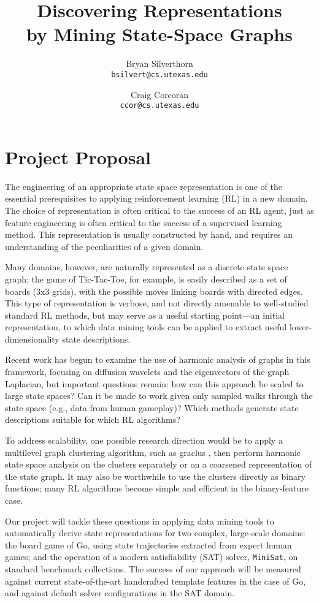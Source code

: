 \documentclass{article}
\title{Discovering Representations\\by Mining State-Space Graphs}
\author{Bryan Silverthorn\\
\texttt{bsilvert@cs.utexas.edu}
\and Craig Corcoran\\
\texttt{ccor@cs.utexas.edu}}
\begin{document}
\maketitle

%
%

\section*{Project Proposal}

The engineering of an appropriate state space representation is one of the
essential prerequisites to applying reinforcement learning (RL) in a new
domain. The choice of representation is often critical to the success of an RL
agent, just as feature engineering is often critical to the success of a
supervised learning method. This representation is usually constructed by hand,
and requires an understanding of the peculiarities of a given domain.

Many domains, however, are naturally represented as a discrete state space
graph: the game of Tic-Tac-Toe, for example, is easily described as a set of
boards (3x3 grids), with the possible moves linking boards with directed edges.
This type of representation is verbose, and not directly amenable to
well-studied standard RL methods, but may serve as a useful starting point---an
initial representation, to which data mining tools can be applied to extract
useful lower-dimensionality state descriptions.

Recent work \citep{Wang2009Multiscale,Mahadevan2006Value,Coifman06Diffusion} has 
begun to examine the use of harmonic analysis of graphs in this framework, 
focusing on diffusion wavelets and the eigenvectors of the graph Laplacian, but 
important questions remain: how can this approach be scaled to large state spaces? 
Can it be made to work given only sampled walks through the state space (e.g., data 
from human gameplay)? Which methods generate state descriptions suitable for which 
RL algorithms?

To address scalability, one possible research direction would be to apply a
multilevel graph clustering algorithm, such as graclus
\citep{Dhillon07weightedgraph}, then perform harmonic state space analysis on
the clusters separately or on a coarsened representation of the state graph. It
may also be worthwhile to use the clusters directly as binary functions; many
RL algorithms become simple and efficient in the binary-feature case.  

Our project will tackle these questions in applying data mining tools to
automatically derive state representations for two complex, large-scale
domains: the board game of Go, using state trajectories extracted from expert
human games; and the operation of a modern satisfiability (SAT) solver,
\texttt{MiniSat}, on standard benchmark collections. The success of our
approach will be measured against current state-of-the-art handcrafted template
features \citep{Silver2007Shape} in the case of Go, and against default solver
configurations in the SAT domain. 
\end{document}
